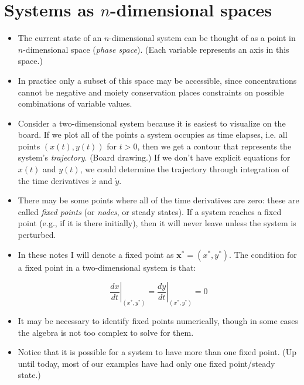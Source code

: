\documentclass{article}
\begin{document}
\section*{Systems as $n$-dimensional spaces}

\begin{itemize}

\item The current state of an $n$-dimensional system can be thought of as a point in $n$-dimensional space (\textit{phase space}). (Each variable represents an axis in this space.)

\item In practice only a subset of this space may be accessible, since concentrations cannot be negative and moiety conservation places constraints on possible combinations of variable values.

\item Consider a two-dimensional system because it is easiest to visualize on the board. If we plot all of the points a system occupies as time elapses, i.e. all points $(x(t),y(t))$ for $t>0$, then we get a contour that represents the system's \textit{trajectory}. (Board drawing.) If we don't have explicit equations for $x(t)$ and $y(t)$, we could determine the trajectory through integration of the time derivatives $\dot{x}$ and $\dot{y}$.

\item There may be some points where all of the time derivatives are zero: these are called \textit{fixed points} (or \textit{nodes}, or steady states). If a system reaches a fixed point (e.g., if it is there initially), then it will never leave unless the system is perturbed.

\item In these notes I will denote a fixed point as $\mathbf{x}^* = (x^*, y^*)$. The condition for a fixed point in a two-dimensional system is that:

\[ \left. \frac{dx}{dt} \right|_{(x^*, y^*)} =  \left. \frac{dy}{dt} \right|_{(x^*, y^*)} = 0 \]

\item It may be necessary to identify fixed points numerically, though in some cases the algebra is not too complex to solve for them.

\item Notice that it is possible for a system to have more than one fixed point. (Up until today, most of our examples have had only one fixed point/steady state.)

\end{itemize}
\end{document}
